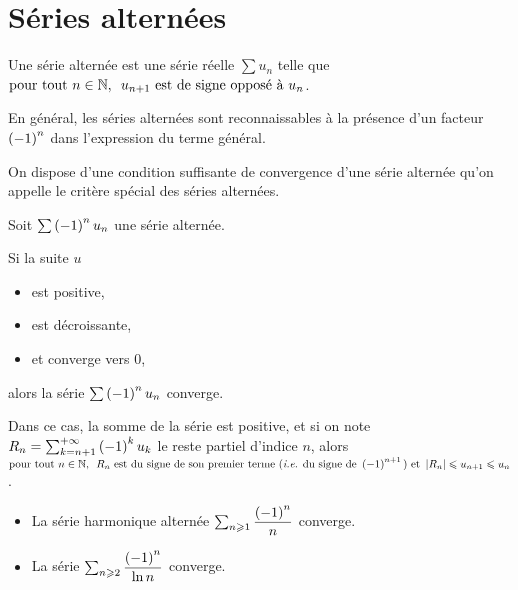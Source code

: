 \section{Séries alternées}

\begin{defi}
Une série alternée est une série réelle \(\sum u_n\) telle que \(\quantifs{\tpt n\in\N}u_{n+1}\text{ est de signe opposé à }u_n\).
\end{defi}

En général, les séries alternées sont reconnaissables à la présence d'un facteur \(\left(-1\right)^n\) dans l'expression du terme général.

On dispose d'une condition suffisante de convergence d'une série alternée qu'on appelle le critère spécial des séries alternées.

\begin{theo}
Soit \(\sum\left(-1\right)^nu_n\) une série alternée.

Si la suite \(u\)

\begin{itemize}
    \item est positive, \\
    \item est décroissante, \\
    \item et converge vers \(0\),
\end{itemize}

alors la série \(\sum\left(-1\right)^nu_n\) converge.

Dans ce cas, la somme de la série est positive, et si on note \(R_n=\sum_{k=n+1}^{+\infty}\left(-1\right)^ku_k\) le reste partiel d'indice \(n\), alors \(\quantifs{\tpt n\in\N}R_n\text{ est du signe de son premier terme (\ie du signe de }\paren{-1}^{n+1}\text{) et }\abs{R_n}\leq u_{n+1}\leq u_n\).
\end{theo}

\begin{ex}
\begin{itemize}
    \item La série harmonique alternée \(\sum_{n\geqslant1}\dfrac{\left(-1\right)^n}{n}\) converge. \\
    \item La série \(\sum_{n\geqslant2}\dfrac{\left(-1\right)^n}{\ln n}\) converge.
\end{itemize}
\end{ex}

